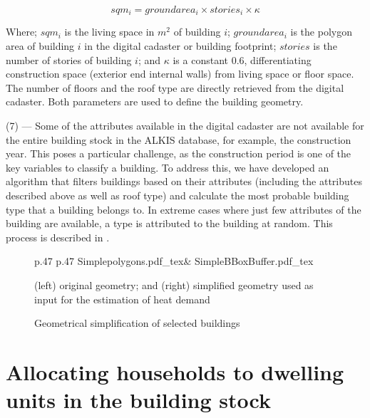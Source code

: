 \documentclass[11pt]{IJM-article}
\begin{document}
\begin{equation} 
    \label{eq:3} 
    sqm_i = groundarea_i \times stories_i \times \kappa 
\end{equation}

Where; $sqm_i$ is the living space in $m^2$ of building $i$; $groundarea_i$ is
the polygon area of building $i$ in the digital cadaster or building footprint;
$stories$ is the number of stories of building $i$; and $\kappa$ is a constant
0.6, differentiating construction space (exterior end internal walls) from
living space or floor space. The number of floors and the roof type are
directly retrieved from the digital cadaster. Both parameters are used to
define the building geometry. 

(7) --- Some of the attributes available in the digital cadaster are not
available for the entire building stock in the ALKIS database, for example, the
construction year. This poses a particular challenge, as the construction
period is one of the key variables to classify a building. To address this, we
have developed an algorithm that filters buildings based on their attributes
(including the attributes described above as well as roof type) and calculate
the most probable building type that a building belongs to. In extreme cases
where just few attributes of the building are available, a type is attributed
to the building at random. This process is described in .

\begin{figure}[htb]
    \centering 
    \caption{Geometrical simplification of selected buildings}\label{fig:5} 
    \vspace{1em}
    \begin{tabular}{p{.47\textwidth} p{.47\textwidth}} 
        \def\svgwidth{\linewidth}
        {Simplepolygons.pdf_tex}& 
        \def\svgwidth{\linewidth}
        {SimpleBBoxBuffer.pdf_tex} 
    \end{tabular} 
    \begin{flushleft}
    \begin{footnotesize}
    (left) original geometry; and (right) simplified geometry used as input for
    the estimation of heat demand
    \end{footnotesize}
    \end{flushleft}
\end{figure}

\section{Allocating households to dwelling units in the building stock}
\label{sec:7}
\end{document}
